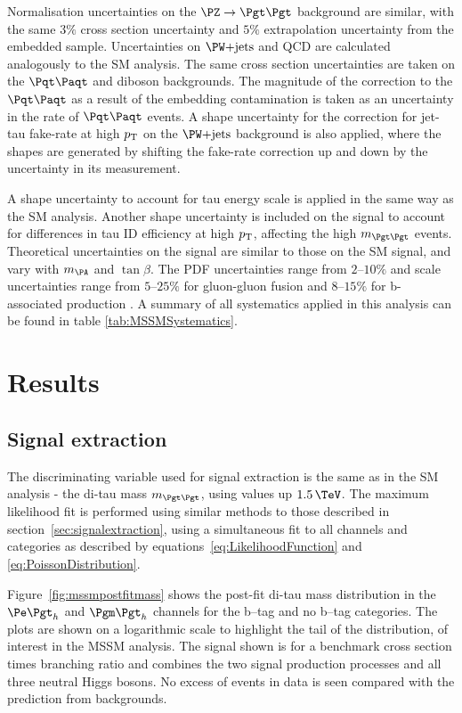 Normalisation uncertainties on the $\ZToTauTau$ background are similar, with the
same $3\%$ cross section uncertainty and $5\%$ extrapolation uncertainty from
the embedded sample. Uncertainties on $\WJets$ and QCD are calculated
analogously to the \ac{SM} analysis. The same cross section uncertainties are taken on the $\ttbar$
and diboson backgrounds. The magnitude of the correction to the $\ttbar$ as a result 
of the embedding contamination is taken as an uncertainty in the rate of $\ttbar$ events. A shape 
uncertainty for the correction for jet-tau fake-rate at high $p_{\mathrm{T}}$ on the $\WJets$ background
is also applied, where the shapes are generated by shifting the fake-rate
correction up and down by the uncertainty in its measurement. 

A shape uncertainty to account for tau energy scale is applied in the same way
as the \ac{SM} analysis. Another shape uncertainty is included on the signal to account for differences in tau ID
efficiency at high $p_{\mathrm{T}}$, affecting the high $m_{\Pgt\Pgt}$ events. 
Theoretical uncertainties on the signal are similar to those on the \ac{SM} signal, and vary
with $m_{\PA}$ and $\tan\beta$. The \ac{PDF} uncertainties range from $2$--$10\%$ and scale uncertainties range from
$5$--$25\%$ for gluon-gluon fusion and $8$--$15\%$ for b-associated production
\cite{HIG-13-021}. A summary of all systematics applied in this analysis can be
found in table \ref{tab:MSSMSystematics}.



\section{Results}
\label{sec:mssmresults}

\subsection{Signal extraction}
\label{sec:mssmSignalExtraction}

The discriminating variable used for signal extraction is the same as in the
\ac{SM} analysis - the di-tau mass $m_{\Pgt\Pgt}$, using values up $1.5\,\TeV$.
The maximum likelihood fit is performed using similar methods to those described in 
section~\ref{sec:signalextraction}, using a simultaneous fit to all channels and
categories as described by equations~\ref{eq:LikelihoodFunction} and \ref{eq:PoissonDistribution}.

Figure~\ref{fig:mssmpostfitmass} shows the post-fit di-tau mass distribution in the
$\etau$ and $\mutau$ channels for the b--tag and no b--tag categories. The plots
are shown on a logarithmic scale to highlight the tail of the distribution, of
interest in the \ac{MSSM} analysis. The signal shown is for a benchmark cross
section times branching ratio and combines the two signal production processes
and all three neutral Higgs bosons. No excess of events in data is seen compared 
with the prediction from backgrounds.


